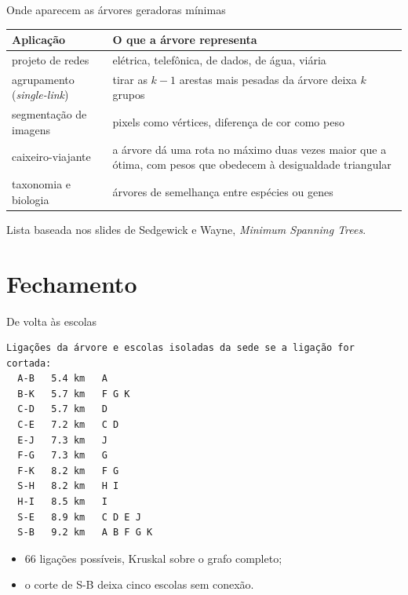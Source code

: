 \documentclass{beamer}
\begin{document}
\begin{frame}{Onde aparecem as árvores geradoras mínimas}
	\footnotesize
	\begin{tabular}{>{\raggedright}p{3.6cm}>{\raggedright\arraybackslash}p{6.4cm}}
		\toprule
		Aplicação & O que a árvore representa \\
		\midrule
		projeto de redes & elétrica, telefônica, de dados, de água, viária \\
		agrupamento (\emph{single-link}) & tirar as $k-1$ arestas mais pesadas
		da árvore deixa $k$ grupos \\
		segmentação de imagens & pixels como vértices, diferença de cor como
		peso \\
		caixeiro-viajante & a árvore dá uma rota no máximo duas vezes maior que a
		ótima, com pesos que obedecem à desigualdade triangular \\
		taxonomia e biologia & árvores de semelhança entre espécies ou genes \\
		\bottomrule
	\end{tabular}

	\vspace{0.2cm}
	\scriptsize
	Lista baseada nos slides de Sedgewick e Wayne, \emph{Minimum Spanning
	Trees}.
\end{frame}

\section{Fechamento}

\begin{frame}[fragile]{De volta às escolas}
	\begin{verbatim}
Ligações da árvore e escolas isoladas da sede se a ligação for cortada:
  A-B   5.4 km   A
  B-K   5.7 km   F G K
  C-D   5.7 km   D
  C-E   7.2 km   C D
  E-J   7.3 km   J
  F-G   7.3 km   G
  F-K   8.2 km   F G
  S-H   8.2 km   H I
  H-I   8.5 km   I
  S-E   8.9 km   C D E J
  S-B   9.2 km   A B F G K
\end{verbatim}
	\footnotesize
	\begin{itemize}
		\item 66 ligações possíveis, Kruskal sobre o grafo completo;
		\item o corte de S-B deixa cinco escolas sem conexão.
	\end{itemize}
\end{frame}
\end{document}
